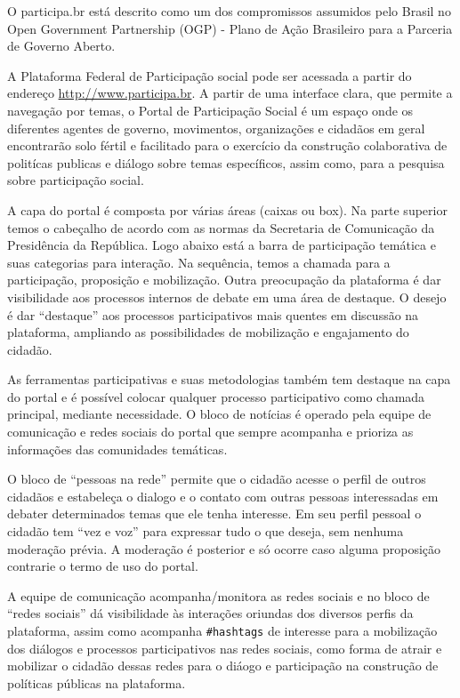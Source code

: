 \documentclass{article}
\begin{document}
O participa.br está descrito como um dos compromissos assumidos pelo Brasil no
Open Government Partnership (OGP) - Plano de Ação Brasileiro para a Parceria de
Governo Aberto.

A Plataforma Federal de Participação social pode ser acessada a partir do
endereço \url{http://www.participa.br}. A partir de uma interface clara, que permite
a navegação por temas, o Portal de Participação Social é um espaço onde os
diferentes agentes de governo, movimentos, organizações e cidadãos em geral
encontrarão solo fértil e facilitado para o exercício da construção
colaborativa de politícas publicas e diálogo sobre temas específicos, assim
como, para a pesquisa sobre participação social.

A capa do portal é composta por várias áreas (caixas ou box). Na parte superior
temos o cabeçalho de acordo com as normas da Secretaria de Comunicação da
Presidência da República. Logo abaixo está a barra de participação temática e
suas categorias para interação. Na sequência, temos a chamada para a
participação, proposição e mobilização. Outra preocupação da plataforma é dar
visibilidade aos processos internos de debate em uma área de destaque. O desejo
é dar ``destaque'' aos processos participativos mais quentes em discussão na
plataforma, ampliando as possibilidades de mobilização e engajamento do
cidadão.

As ferramentas participativas e suas metodologias também tem destaque na capa
do portal e é possível colocar qualquer processo participativo como chamada
principal, mediante necessidade. O bloco de notícias é operado pela equipe de
comunicação e redes sociais do portal que sempre acompanha e prioriza as
informações das comunidades temáticas.

O bloco de ``pessoas na rede'' permite que o cidadão acesse o perfil de outros
cidadãos e estabeleça o dialogo e o contato com outras pessoas interessadas em
debater determinados temas que ele tenha interesse. Em seu perfil pessoal o
cidadão tem ``vez e voz'' para expressar tudo o que deseja, sem nenhuma moderação
prévia. A moderação é posterior e só ocorre caso alguma proposição contrarie o
termo de uso do portal.

A equipe de comunicação acompanha/monitora as redes sociais e no bloco de
``redes sociais''  dá visibilidade às interações oriundas dos diversos perfis da
plataforma, assim como acompanha \texttt{\#hashtags} de interesse para a mobilização dos
diálogos e processos participativos nas redes sociais, como forma de atrair e
mobilizar o cidadão dessas redes para o diáogo e participação na construção de
políticas públicas na plataforma.
\end{document}
